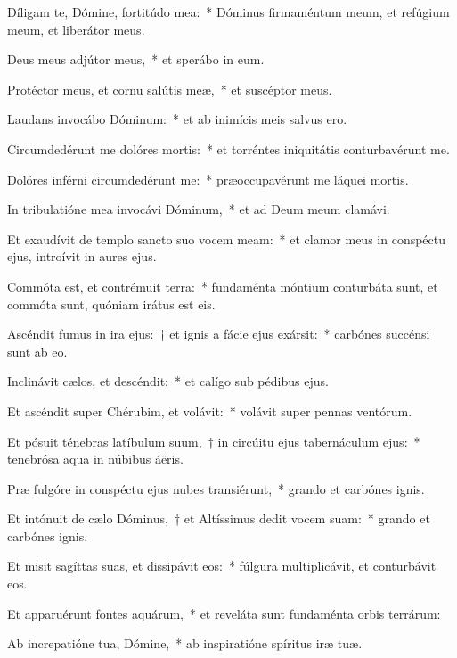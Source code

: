 \item Díligam te, Dómine, fortitúdo mea:~* Dóminus firmaméntum meum, et refúgium meum, et liberátor meus.

\item Deus meus adjútor meus,~* et sperábo in eum.

\item Protéctor meus, et cornu salútis meæ,~* et suscéptor meus.

\item Laudans invocábo Dóminum:~* et ab inimícis meis salvus ero.

\item Circumdedérunt me dolóres mortis:~* et torréntes iniquitátis conturbavérunt me.

\item Dolóres inférni circumdedérunt me:~* præoccupavérunt me láquei mortis.

\item In tribulatióne mea invocávi Dóminum,~* et ad Deum meum clamávi.

\item Et exaudívit de templo sancto suo vocem meam:~* et clamor meus in conspéctu ejus, introívit in aures ejus.

\item Commóta est, et contrémuit terra:~* fundaménta móntium conturbáta sunt, et commóta sunt, quóniam irátus est eis.

\item Ascéndit fumus in ira ejus:~† et ignis a fácie ejus exársit:~* carbónes succénsi sunt ab eo.

\item Inclinávit cælos, et descéndit:~* et calígo sub pédibus ejus.

\item Et ascéndit super Chérubim, et volávit:~* volávit super pennas ventórum.

\item Et pósuit ténebras latíbulum suum,~† in circúitu ejus tabernáculum ejus:~* tenebrósa aqua in núbibus áëris.

\item Præ fulgóre in conspéctu ejus nubes transiérunt,~* grando et carbónes ignis.

\item Et intónuit de cælo Dóminus,~† et Altíssimus dedit vocem suam:~* grando et carbónes ignis.

\item Et misit sagíttas suas, et dissipávit eos:~* fúlgura multiplicávit, et conturbávit eos.

\item Et apparuérunt fontes aquárum,~* et reveláta sunt fundaménta orbis terrárum:

\item Ab increpatióne tua, Dómine,~* ab inspiratióne spíritus iræ tuæ.